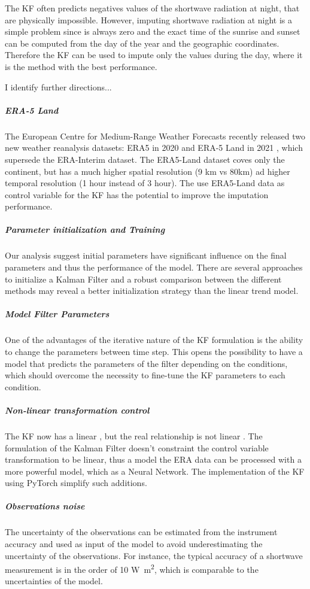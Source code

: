 \documentclass{article}
\begin{document}
The KF often predicts negatives values of the shortwave radiation at night, that are physically impossible. However, imputing shortwave radiation at night is a simple problem since is always zero and the exact time of the sunrise and sunset can be computed from the day of the year and the geographic coordinates. Therefore the KF can be used to impute only the values during the day, where it is the method with the best performance.

I identify further directions...

\subparagraph{ERA-5 Land} The European Centre for Medium-Range Weather Forecasts recently released two new weather reanalysis datasets: ERA5 in 2020 \cite{hersbach_era5_2020} and ERA-5 Land  in 2021 \cite{munoz-sabater_era5-land_2021}, which supersede the ERA-Interim dataset. The ERA5-Land dataset coves only the continent, but has a much higher spatial resolution (9 km vs 80km) ad higher temporal resolution (1 hour instead of 3 hour). The use ERA5-Land data as control variable for the KF has the potential to improve the imputation performance.

\subparagraph{Parameter initialization and Training} Our analysis suggest initial parameters have significant influence on the final parameters and thus the performance of the model. There are several approaches to initialize a Kalman Filter \cite{durbin_time_2012} and a robust comparison between the different methods may reveal a better initialization strategy than the linear trend model.  

\subparagraph{Model Filter Parameters} One of the advantages of the iterative nature of the KF formulation is the ability to change the parameters between time step. This opens the possibility to have a model that predicts the parameters of the filter depending on the conditions, which should overcome the necessity to fine-tune the KF parameters to each condition. 

\subparagraph{Non-linear transformation control} The KF now has a linear , but the real relationship is not linear . The formulation of the Kalman Filter doesn't constraint the control variable transformation to be linear, thus a model the ERA data can be processed with a more powerful model, which as a Neural Network. The implementation of the KF using PyTorch simplify such additions.

\subparagraph{Observations noise} The uncertainty of the observations can be estimated from the instrument accuracy and used as input of the model to avoid underestimating the uncertainty of the observations. For instance, the typical accuracy of a shortwave measurement is in the order of 10 \si{W\m^2}, which is comparable to the uncertainties of the model.
\end{document}

